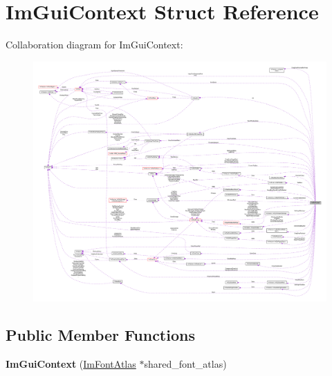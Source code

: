 \hypertarget{structImGuiContext}{}\section{Im\+Gui\+Context Struct Reference}
\label{structImGuiContext}


Collaboration diagram for Im\+Gui\+Context\+:\nopagebreak
\begin{figure}[H]
\begin{center}
\leavevmode
\includegraphics[width=350pt]{structImGuiContext__coll__graph}
\end{center}
\end{figure}
\subsection*{Public Member Functions}
\begin{DoxyCompactItemize}
\item 
\mbox{\label{structImGuiContext_a5842ccae7b18271370b6d5f7f698d8bd}} 
{\bfseries Im\+Gui\+Context} (\hyperlink{structImFontAtlas}{Im\+Font\+Atlas} $\ast$shared\+\_\+font\+\_\+atlas)
\end{DoxyCompactItemize}
